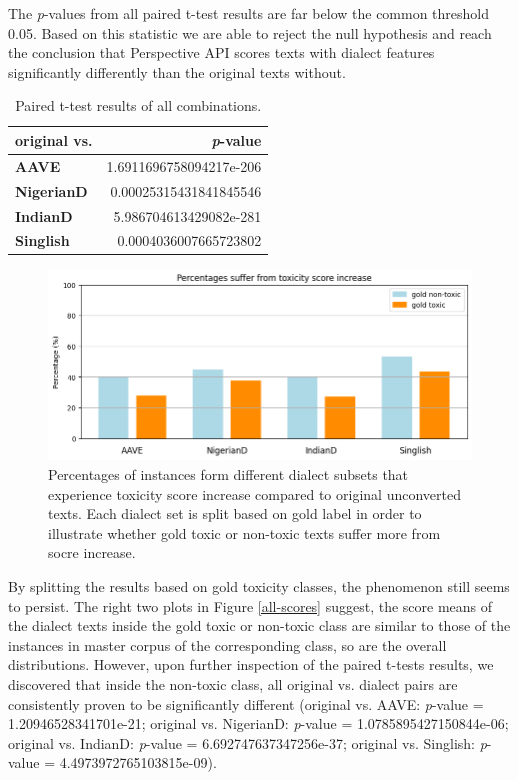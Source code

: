 \documentclass[11pt]{article}
\begin{document}
The \textit{p}-values from all paired t-test results are far below the common threshold 0.05. Based on this statistic we are able to reject the null hypothesis and reach the conclusion that Perspective API scores texts with dialect features significantly differently than the original texts without.

\begin{table}[t]
\centering
\begin{tabular}{lr}
\hline
\textbf{original vs.} & \textbf{\textit{p}-value}        \\ \hline
\textbf{AAVE}         & 1.6911696758094217e-206 \\
\textbf{NigerianD}    & 0.00025315431841845546  \\
\textbf{IndianD}      & 5.986704613429082e-281  \\
\textbf{Singlish}     & 0.0004036007665723802   \\ \hline
\end{tabular}
\caption{Paired t-test results of all combinations.}
\label{paired-overall}
\end{table}

\begin{figure}[t]
  \includegraphics[width=1.0\linewidth]{figs-misc/score-increase-percentages.png}
  \caption{Percentages of instances form different dialect subsets that experience toxicity score increase compared to original unconverted texts. Each dialect set is split based on gold label in order to illustrate whether gold toxic or non-toxic texts suffer more from socre increase.}
  \label{inc-percentages}
\end{figure}

By splitting the results based on gold toxicity classes, the phenomenon still seems to persist. The right two plots in Figure \ref{all-scores} suggest, the score means of the dialect texts inside the gold toxic or non-toxic class are similar to those of the instances in master corpus of the corresponding class, so are the overall distributions. However, upon further inspection of the paired t-tests results, we discovered that inside the non-toxic class, all original vs. dialect pairs are consistently proven to be significantly different (original vs. AAVE: \textit{p}-value = 1.20946528341701e-21; original vs. NigerianD: \textit{p}-value = 1.0785895427150844e-06; original vs. IndianD: \textit{p}-value = 6.692747637347256e-37; original vs. Singlish: \textit{p}-value = 4.4973972765103815e-09).
\end{document}
